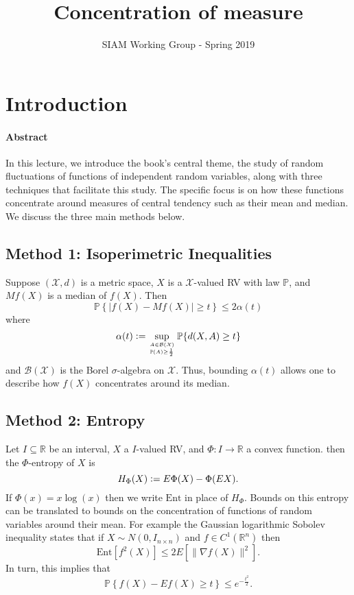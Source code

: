 \documentclass[reqno]{amsproc}
\title{Concentration of measure}
\author{SIAM Working Group - Spring 2019}
\newcommand{\defeq}{\vcentcolon=} %
\newcommand{\R}{\mathbb{R}}
\newcommand{\Rn}{\mathbb{R}^n}
\renewcommand{\P}{\mathbb{P}} %
\begin{document}
\maketitle
\tableofcontents


\section{Introduction}
\label{sec:introduction}
\paragraph{\textbf{Abstract}}
	In this lecture, we introduce the book's central theme, the study of random fluctuations of functions of independent random variables, along with three techniques that facilitate this study. The specific focus is on how these functions concentrate around measures of central tendency such as their mean and median. We discuss the three main methods below.

\subsection*{Method 1: Isoperimetric Inequalities}
\label{sec:method_of_isoperimetric_inequalities}
	Suppose $(\mathcal{X},d)$ is a metric space, $X$ is a $\mathcal{X}$-valued RV with law $\P$, and $Mf(X)$ is a median of $f(X)$. Then
	\[
		\P\left\{|f(X)-Mf(X)|\geq t\right\}\leq 2\alpha(t)
	\]
	where
	\[
		\alpha(t)\defeq\sup_{A\in \mathcal{B}(\mathcal{X})\atop \P(A)\geq\frac{1}{2}}\P\{d(X,A)\geq t\}
	\]
	and $\mathcal{B}(\mathcal{X})$ is the Borel $\sigma$-algebra on $\mathcal{X}$. Thus, bounding $\alpha(t)$ allows one to describe how $f(X)$ concentrates around its median.

\subsection*{Method 2: Entropy}
\label{sec:entropy_method}
	Let $I\subseteq\R$ be an interval, $X$ a $I$-valued RV, and $\Phi:I\to\R$ a convex function. then the $\Phi$-entropy of $X$ is
	\[
		H_\Phi(X)\defeq E\Phi(X)-\Phi(EX).
	\]
	If $\Phi(x)=x\log(x)$ then we write $\text{Ent}$ in place of $H_\Phi$. Bounds on this entropy can be translated to bounds on the concentration of functions of random variables around their mean. For example the Gaussian logarithmic Sobolev inequality states that if $X\sim N(0,I_{n\times n})$ and $f\in C^1(\Rn)$ then
	\[
		\text{Ent}\left[f^2(X)\right]\leq 2E\left[\|\nabla f(X)\|^2\right].
	\]
	In turn, this implies that
	\[
		\P\left\{f(X)-Ef(X)\geq t\right\}\leq e^{-\frac{t^2}{2}}.
	\]
\end{document}
